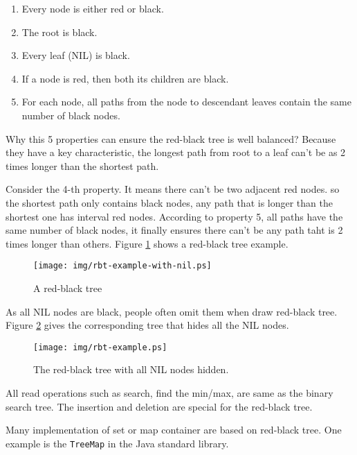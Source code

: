 \documentclass{article}
\begin{document}
\begin{enumerate}
\item Every node is either red or black.
\item The root is black.
\item Every leaf (NIL) is black.
\item If a node is red, then both its children are black.
\item For each node, all paths from the node to descendant leaves contain the same number of black nodes.
\end{enumerate}

Why this 5 properties can ensure the red-black tree is well balanced?
Because they have a key characteristic, the longest path from root to
a leaf can't be as 2 times longer than the shortest path.

Consider the 4-th property. It means there can't be two adjacent
red nodes. so the shortest path only contains black nodes, any path
that is longer than the shortest one has interval red nodes. According to
property 5, all paths have the same number of black nodes,
it finally ensures there can't be any path taht is 2 times longer than
others\cite{wiki}. Figure \ref{fig:rbt-example-with-nil} shows a red-black tree example.

\begin{figure}[htbp]
       \begin{center}
	\texttt{[image: img/rbt-example-with-nil.ps]}
        \caption{A red-black tree} \label{fig:rbt-example-with-nil}
       \end{center}
\end{figure}

As all NIL nodes are black, people often omit them when draw red-black tree. Figure \ref{fig:rbt-example} gives the corresponding tree that hides all the NIL nodes.

\begin{figure}[htbp]
       \begin{center}
	\texttt{[image: img/rbt-example.ps]}
        \caption{The red-black tree with all NIL nodes hidden.} \label{fig:rbt-example}
       \end{center}
\end{figure}

All read operations such as search, find the min/max, are same as the
binary search tree. The insertion and deletion are special for the red-black tree.

Many implementation of set or map container are based on red-black tree.
One example is the \texttt{TreeMap} in the Java standard library.
\end{document}
